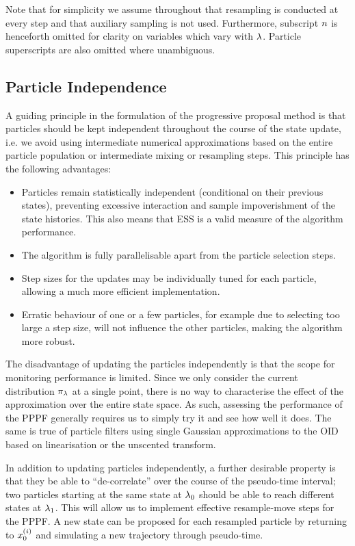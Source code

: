 \documentclass{article}
\begin{document}
Note that for simplicity we assume throughout that resampling is conducted at every step and that auxiliary sampling is not used. Furthermore, subscript $n$ is henceforth omitted for clarity on variables which vary with $\lambda$. Particle superscripts are also omitted where unambiguous.



\subsection{Particle Independence} \label{sec:particle_independence}

A guiding principle in the formulation of the progressive proposal method is that particles should be kept independent throughout the course of the state update, i.e. we avoid using intermediate numerical approximations based on the entire particle population or intermediate mixing or resampling steps. This principle has the following advantages:
%
\begin{itemize}
  \item Particles remain statistically independent (conditional on their previous states), preventing excessive interaction and sample impoverishment of the state histories. This also means that ESS is a valid measure of the algorithm performance.
  \item The algorithm is fully parallelisable apart from the particle selection steps.
  \item Step sizes for the updates may be individually tuned for each particle, allowing a much more efficient implementation.
  \item Erratic behaviour of one or a few particles, for example due to selecting too large a step size, will not influence the other particles, making the algorithm more robust.
\end{itemize}

The disadvantage of updating the particles independently is that the scope for monitoring performance is limited. Since we only consider the current distribution $\pi_{\lambda}$ at a single point, there is no way to characterise the effect of the approximation over the entire state space. As such, assessing the performance of the PPPF generally requires us to simply try it and see how well it does. The same is true of particle filters using single Gaussian approximations to the OID based on linearisation or the unscented transform.

In addition to updating particles independently, a further desirable property is that they be able to ``de-correlate'' over the course of the pseudo-time interval; two particles starting at the same state at $\lambda_0$ should be able to reach different states at $\lambda_1$. This will allow us to implement effective resample-move steps for the PPPF. A new state can be proposed for each resampled particle by returning to $x_{0}^{(i)}$ and simulating a new trajectory through pseudo-time.
\end{document}
